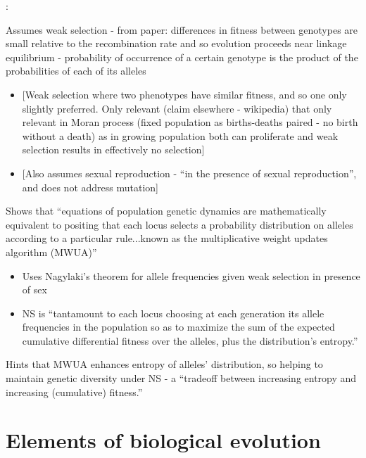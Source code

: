 \autocite{Chastain2014}:

	Assumes weak selection - from paper: differences in fitness between
	genotypes are small relative to the recombination rate and so
	evolution proceeds near linkage equilibrium - probability of
	occurrence of a certain genotype is the product of the probabilities
	of each of its alleles
	
	
	\begin{itemize}
		\item
		
		{[}Weak selection where two phenotypes have similar fitness, and so
		one only slightly preferred. Only relevant (claim elsewhere -
		wikipedia) that only relevant in Moran process (fixed population as
		births-deaths paired - no birth without a death) as in growing
		population both can proliferate and weak selection results in
		effectively no selection{]}
		
		\item
		
		{[}Also assumes sexual reproduction - ``in the presence of sexual
		reproduction'', and does not address mutation{]}
		
	\end{itemize}

	
	Shows that ``equations of population genetic dynamics are
	mathematically equivalent to positing that each locus selects a
	probability distribution on alleles according to a particular
	rule...known as the multiplicative weight updates algorithm (MWUA)''
	
	
	\begin{itemize}
		\item
		
		Uses Nagylaki's theorem for allele frequencies given weak selection
		in presence of sex
		
		\item
		
		NS is ``tantamount to each locus choosing at each generation its
		allele frequencies in the population so as to maximize the sum of
		the expected cumulative differential fitness over the alleles, plus
		the distribution's entropy.''
		
	\end{itemize}

	
	Hints that MWUA enhances entropy of alleles' distribution, so helping
	to maintain genetic diversity under NS - a ``tradeoff between
	increasing entropy and increasing (cumulative) fitness.''
	

\section{Elements of biological evolution}
	
